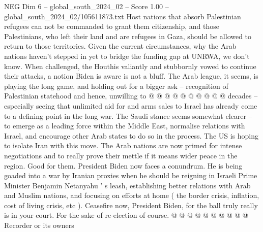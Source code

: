 \begin{textsample}{NEG Dim 6 – global\_south\_2024\_02 – Score 1.00 – global\_south\_2024\_02/105611873.txt}
Host nations that absorb Palestinian refugees can not be commanded to grant them citizenship, and those Palestinians, who left their land and are refugees in Gaza, should be allowed to return to those territories.
Given the current circumstances, why the Arab nations haven't stepped in yet to bridge the funding gap at UNRWA, we don't know.
When challenged, the Houthis valiantly and stubbornly vowed to continue their attacks, a notion Biden is aware is not a bluff.
The Arab league, it seems, is playing the long game, and holding out for a bigger ask -- recognition of Palestinian statehood and hence, unwilling to @ @ @ @ @ @ @ @ @ @ decades -- especially seeing that unlimited aid for and arms sales to Israel has already come to a defining point in the long war.
The Saudi stance seems somewhat clearer -- to emerge as a leading force within the Middle East, normalise relations with Israel, and encourage other Arab states to do so in the process.
The US is hoping to isolate Iran with this move.
The Arab nations are now primed for intense negotiations and to really prove their mettle if it means wider peace in the region.
Good for them.
President Biden now faces a conundrum.
He is being goaded into a war by Iranian proxies when he should be reigning in Israeli Prime Minister Benjamin Netanyahu ' s leash, establishing better relations with Arab and Muslim nations, and focusing on efforts at home ( the border crisis, inflation, cost of living crisis, etc ).
Ceasefire now, President Biden, for the ball truly really is in your court.
For the sake of re-election of course. @ @ @ @ @ @ @ @ @ @ Recorder or its owners

\end{textsample}
